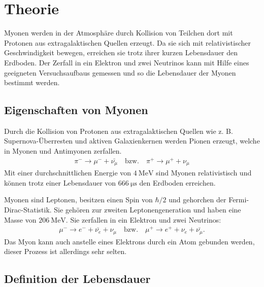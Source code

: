 \section{Theorie}

Myonen werden in der Atmosphäre durch Kollision von Teilchen dort mit Protonen aus extragalaktischen Quellen erzeugt. Da sie sich mit relativistischer Geschwindigkeit bewegen, erreichen sie trotz ihrer kurzen Lebensdauer den Erdboden. Der Zerfall in ein Elektron und zwei Neutrinos kann mit Hilfe eines geeigneten Versuchsaufbaus gemessen und so die Lebensdauer der Myonen bestimmt werden.

\subsection{Eigenschaften von Myonen}

Durch die Kollision von Protonen aus extragalaktischen Quellen wie z. B. Supernova-Überresten und aktiven Galaxienkernen werden Pionen erzeugt, welche in Myonen und Antimyonen zerfallen.
\begin{align}
	\pi^- \to \mu^- + \bar{\nu_\mu} \quad \text{bzw.} \quad \pi^+ \to \mu^+ + \nu_\mu
\end{align}
Mit einer durchschnittlichen Energie von $\SI{4}{\mega\electronvolt}$ \cite{PGD} sind Myonen relativistisch und können trotz einer Lebensdauer von $\SI{666}{\micro\second}$ \cite{PDG} den Erdboden erreichen.\par
Myonen sind Leptonen, besitzen einen Spin von $\hbar/2$ und gehorchen der Fermi-Dirac-Statistik. Sie gehören zur zweiten Leptonengeneration und haben eine Masse von $\SI{206}{\mega\electronvolt}$. Sie zerfallen in ein Elektron und zwei Neutrinos:
\begin{align}
	\mu^- \to e^- + \bar{\nu_e} + \nu_\mu \quad \text{bzw.} \quad \mu^+ \to e^+ + \nu_e + \bar{\nu_\mu}.
\end{align}
Das Myon kann auch anstelle eines Elektrons durch ein Atom gebunden werden, dieser Prozess ist allerdings sehr selten.

\subsection{Definition der Lebensdauer}

